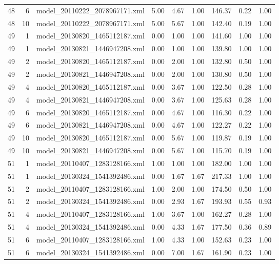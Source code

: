 \begin{table}[ht]
\begin{tabular}{rrlrrrrrr}
   48 &   6 & model\_20110222\_2078967171.xml & 5.00 & 4.67 & 1.00 & 146.37 & 0.22 & 1.00 \\ 
   48 &  10 & model\_20110222\_2078967171.xml & 5.00 & 5.67 & 1.00 & 142.40 & 0.19 & 1.00 \\ 
   49 &   1 & model\_20130820\_1465112187.xml & 0.00 & 1.00 & 1.00 & 141.60 & 1.00 & 1.00 \\ 
   49 &   1 & model\_20130821\_1446947208.xml & 0.00 & 1.00 & 1.00 & 139.80 & 1.00 & 1.00 \\ 
   49 &   2 & model\_20130820\_1465112187.xml & 0.00 & 2.00 & 1.00 & 132.80 & 0.50 & 1.00 \\ 
   49 &   2 & model\_20130821\_1446947208.xml & 0.00 & 2.00 & 1.00 & 130.80 & 0.50 & 1.00 \\ 
   49 &   4 & model\_20130820\_1465112187.xml & 0.00 & 3.67 & 1.00 & 122.50 & 0.28 & 1.00 \\ 
   49 &   4 & model\_20130821\_1446947208.xml & 0.00 & 3.67 & 1.00 & 125.63 & 0.28 & 1.00 \\ 
   49 &   6 & model\_20130820\_1465112187.xml & 0.00 & 4.67 & 1.00 & 116.30 & 0.22 & 1.00 \\ 
   49 &   6 & model\_20130821\_1446947208.xml & 0.00 & 4.67 & 1.00 & 122.27 & 0.22 & 1.00 \\ 
   49 &  10 & model\_20130820\_1465112187.xml & 0.00 & 5.67 & 1.00 & 119.87 & 0.19 & 1.00 \\ 
   49 &  10 & model\_20130821\_1446947208.xml & 0.00 & 5.67 & 1.00 & 115.70 & 0.19 & 1.00 \\ 
   51 &   1 & model\_20110407\_1283128166.xml & 1.00 & 1.00 & 1.00 & 182.00 & 1.00 & 1.00 \\ 
   51 &   1 & model\_20130324\_1541392486.xml & 0.00 & 1.67 & 1.67 & 217.33 & 1.00 & 1.00 \\ 
   51 &   2 & model\_20110407\_1283128166.xml & 1.00 & 2.00 & 1.00 & 174.50 & 0.50 & 1.00 \\ 
   51 &   2 & model\_20130324\_1541392486.xml & 0.00 & 2.93 & 1.67 & 193.93 & 0.55 & 0.93 \\ 
   51 &   4 & model\_20110407\_1283128166.xml & 1.00 & 3.67 & 1.00 & 162.27 & 0.28 & 1.00 \\ 
   51 &   4 & model\_20130324\_1541392486.xml & 0.00 & 4.33 & 1.67 & 177.50 & 0.36 & 0.89 \\ 
   51 &   6 & model\_20110407\_1283128166.xml & 1.00 & 4.33 & 1.00 & 152.63 & 0.23 & 1.00 \\ 
   51 &   6 & model\_20130324\_1541392486.xml & 0.00 & 7.00 & 1.67 & 161.90 & 0.23 & 1.00 \\ 

\end{tabular}
\end{table}
